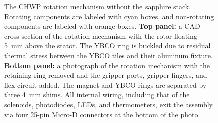 \begin{figure}[!t]
    \centering
    \hfill
    \caption{The CHWP rotation mechanism without the sapphire stack. Rotating components are labeled with cyan boxes, and non-rotating components are labeled with orange boxes. \textbf{Top panel:} a CAD cross section of the rotation mechanism with the rotor floating 5~mm above the stator. The YBCO ring is buckled due to residual thermal stress between the YBCO tiles and their aluminum fixture. \textbf{Bottom panel:} a photograph of the rotation mechanism with the retaining ring removed and the gripper ports, gripper fingers, and flex circuit added. The magnet and YBCO rings are separated by three 4~mm shims. All internal wiring, including that of the solenoids, photodiodes, LEDs, and thermometers, exit the assembly via four 25-pin Micro-D connectors at the bottom of the photo.}
    \label{fig:chwp_tabletop}
\end{figure}

